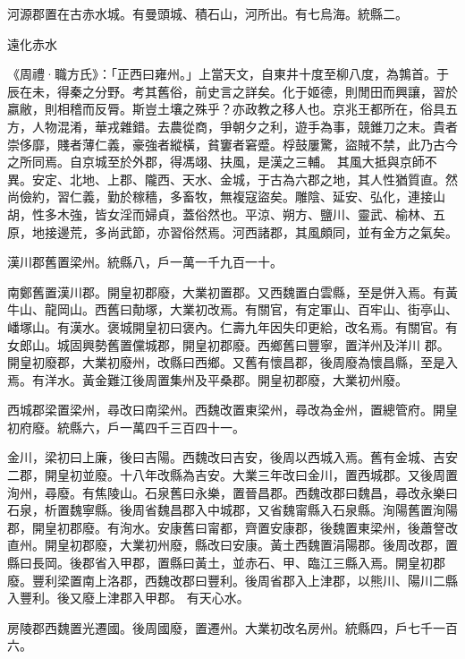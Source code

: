 \begin{pinyinscope}
 河源郡置在古赤水城。有曼頭城、積石山，河所出。有七烏海。統縣二。



 遠化赤水



 《周禮·職方氏》：「正西曰雍州。」上當天文，自東井十度至柳八度，為鶉首。于辰在未，得秦之分野。考其舊俗，前史言之詳矣。化于姬德，則閒田而興讓，習於嬴敝，則相稽而反脣。斯豈土壤之殊乎？亦政教之移人也。京兆王都所在，俗具五方，人物混淆，華戎雜錯。去農從商，爭朝夕之利，遊手為事，競錐刀之末。貴者崇侈靡，賤者薄仁義，豪強者縱橫，貧窶者窘蹙。桴鼓屢驚，盜賊不禁，此乃古今之所同焉。自京城至於外郡，得馮翊、扶風，是漢之三輔。
 其風大抵與京師不異。安定、北地、上郡、隴西、天水、金城，于古為六郡之地，其人性猶質直。然尚儉約，習仁義，勤於稼穡，多畜牧，無複寇盜矣。雕陰、延安、弘化，連接山胡，性多木強，皆女淫而婦貞，蓋俗然也。平涼、朔方、鹽川、靈武、榆林、五原，地接邊荒，多尚武節，亦習俗然焉。河西諸郡，其風頗同，並有金方之氣矣。



 漢川郡舊置梁州。統縣八，戶一萬一千九百一十。



 南鄭舊置漢川郡。開皇初郡廢，大業初置郡。又西魏置白雲縣，至是併入焉。有黃牛山、龍岡山。西舊曰勣塚，大業初改焉。有關官，有定軍山、百牢山、街亭山、嶓塚山。有漢水。褒城開皇初曰褒內。仁壽九年因失印更給，改名焉。有關官。有女郎山。城固興勢舊置儻城郡，開皇初郡廢。西鄉舊曰豐寧，置洋州及洋川
 郡。開皇初廢郡，大業初廢州，改縣曰西鄉。又舊有懷昌郡，後周廢為懷昌縣，至是入焉。有洋水。黃金難江後周置集州及平桑郡。開皇初郡廢，大業初州廢。



 西城郡梁置梁州，尋改曰南梁州。西魏改置東梁州，尋改為金州，置總管府。開皇初府廢。統縣六，戶一萬四千三百四十一。



 金川，梁初曰上廉，後曰吉陽。西魏改曰吉安，後周以西城入焉。舊有金城、吉安二郡，開皇初並廢。十八年改縣為吉安。大業三年改曰金川，置西城郡。又後周置洵州，尋廢。有焦陵山。石泉舊曰永樂，置晉昌郡。西魏改郡曰魏昌，尋改永樂曰石泉，析置魏寧縣。後周省魏昌郡入中城郡，又省魏甯縣入石泉縣。洵陽舊置洵陽郡，開皇初郡廢。有洵水。安康舊曰甯都，齊置安康郡，後魏置東梁州，後蕭詧改直州。開皇初郡廢，大業初州廢，縣改曰安康。黃土西魏置涓陽郡。後周改郡，置縣曰長岡。後郡省入甲郡，置縣曰黃土，並赤石、甲、臨江三縣入焉。開皇初郡廢。豐利梁置南上洛郡，西魏改郡曰豐利。後周省郡入上津郡，以熊川、陽川二縣入豐利。後又廢上津郡入甲郡。
 有天心水。



 房陵郡西魏置光遷國。後周國廢，置遷州。大業初改名房州。統縣四，戶七千一百六。




\end{pinyinscope}
